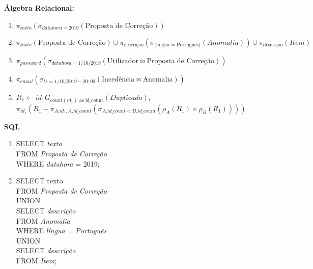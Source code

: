 \documentclass[12pt]{report}
\begin{document}
\newpage
\Large
\textbf{Álgebra Relacional: }\\

\large

\begin{enumerate}
	\item $\pi_{texto}(\sigma_{datahora = 2019}(\text{Proposta de Correção}))$
	\item $\pi_{texto}(\text{Proposta de Correção}) \cup \pi_{\text{descrição}}(\sigma_{\text{(língua = Português)}}(Anomalia)) \cup
		\pi_{\text{descrição}}(Item)$
    \item $\pi_{password}(\sigma_{datahora = 1/10/2019}(\text{Utilizador}\bowtie\text{Proposta de Correção}))$
    \item $\pi_{email}(\sigma_{ts = 1/10/2019 - 20:00}(\text{Incedência}\bowtie\text{Anomalia}))$
	\item $R_{1} \gets id_{1}G_{count(id_{1}) \text{ as id\_count}}(Duplicado),$\\
		$ \pi_{id_{1}}(R_{1} - \pi_{A.id_{1}, A.id\_count}(\sigma_{A.id\_count < B.id\_count}(\rho_{A}(R_{1}) \times \rho_{B}(R_{1}))))$
\end{enumerate}

\Large
\textbf{SQL}

\normalsize

\begin{enumerate}
	\item SELECT \textit{texto} \\
		FROM \textit{Proposta de Correção} \\
		WHERE \textit{datahora} = 2019;
	\item SELECT texto \\
		FROM \textit{Proposta de Correção} \\
		UNION \\
		SELECT \textit{descrição} \\
		FROM \textit{Anomalia} \\
		WHERE \textit{língua = Português} \\
		UNION \\
		SELECT \textit{descrição} \\
		FROM \textit{Item};
\end{enumerate}
\end{document}
